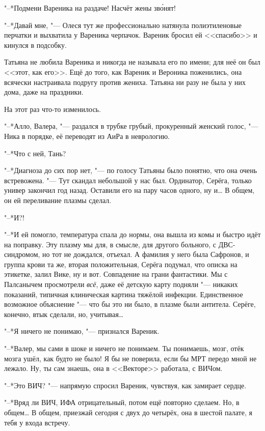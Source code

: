 "--*Подмени Вареника на раздаче!
Насчёт жены зв\'онят!

"--*Давай мне, "--- Олеся тут же профессионально натянула полиэтиленовые перчатки и выхватила у Вареника черпачок.
Вареник бросил ей <<спасибо>> и кинулся в подсобку.

Татьяна не любила Вареника и никогда не называла его по имени;
для неё он был <<этот, как его>>.
Ещё до того, как Вареник и Вероника поженились, она всячески настраивала подругу против жениха.
Татьяна ни разу не была у них дома, даже на праздники.

На этот раз что-то изменилось.

"--*Алло, Валера, "--- раздался в трубке грубый, прокуренный женский голос, "--- Ника в порядке, её переводят из АиРа в неврологию.

"--*Что с ней, Тань?

"--*Диагноза до сих пор нет, "--- по голосу Татьяны было понятно, что она очень встревожена.
"--- Тут скандал небольшой у нас был.
Ординатор, Серёга, только универ закончил год назад.
Оставили его на пару часов одного, ну и\dots{}
В общем, он ей переливание плазмы сделал.

"--*И?!

"--*И ей помогло, температура спала до нормы, она вышла из комы и быстро идёт на поправку.
Эту плазму мы для, в смысле, для другого больного, с ДВС-синдромом, но тот не дождался, отъехал.
А фамилия у него была Сафронов, и группа крови та же, вторая положительная, Серёга подумал, что описка на этикетке, залил Вике, ну и вот.
Совпадение на грани фантастики.
Мы с Палсанычем просмотрели \emph{всё}, даже её детскую карту подняли "--- никаких показаний, типичная клиническая картина тяжёлой инфекции.
Единственное возможное объяснение "--- что бы это ни было, в плазме были антитела.
Серёге, конечно, втык сделали, но, учитывая\dots{}

"--*Я ничего не понимаю, "--- признался Вареник.

"--*Валер, мы сами в шоке и ничего не понимаем.
Ты понимаешь, мозг, отёк мозга ушёл, как будто не было!
Я бы не поверила, если бы МРТ передо мной не лежало.
Ну, ты сам знаешь, она в <<Векторе>> работала, с ВИЧом.

"--*Это ВИЧ? "--- напрямую спросил Вареник, чувствуя, как замирает сердце.

"--*Вряд ли ВИЧ, ИФА отрицательный, потом ещё повторно сделаем.
Но, в общем\dots{}
В общем, приезжай сегодня с двух до четырёх, она в шестой палате, я тебя у входа встречу.

